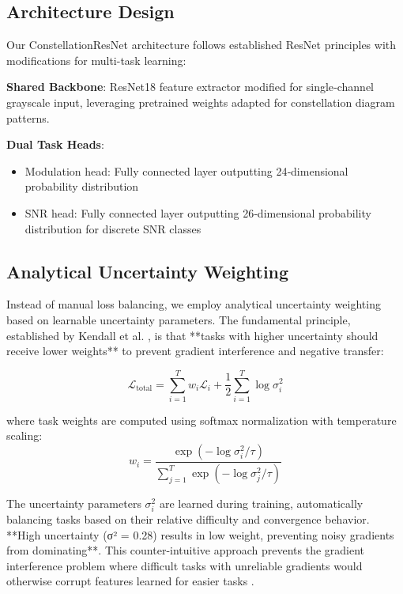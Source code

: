 \documentclass{ELSP}
\begin{document}
\subsection{Architecture Design}

Our ConstellationResNet architecture follows established ResNet principles \cite{kumar2023automatic} with modifications for multi-task learning:

\textbf{Shared Backbone}: ResNet18 feature extractor modified for single‑channel grayscale input, leveraging pretrained weights adapted for constellation diagram patterns.

\textbf{Dual Task Heads}: 
\begin{itemize}
\item Modulation head: Fully connected layer outputting 24‑dimensional probability distribution
\item SNR head: Fully connected layer outputting 26‑dimensional probability distribution for discrete SNR classes
\end{itemize}

\subsection{Analytical Uncertainty Weighting}

Instead of manual loss balancing, we employ analytical uncertainty weighting \cite{liu2024analytical} based on learnable uncertainty parameters. The fundamental principle, established by Kendall et al. \cite{kendall2018multi}, is that **tasks with higher uncertainty should receive lower weights** to prevent gradient interference and negative transfer:

\begin{equation}
\mathcal{L}_{\text{total}} = \sum_{i=1}^{T} w_i \mathcal{L}_i + \frac{1}{2}\sum_{i=1}^{T} \log \sigma_i^2
\end{equation}

where task weights are computed using softmax normalization with temperature scaling:
\begin{equation}
w_i = \frac{\exp(-\log \sigma_i^2 / \tau)}{\sum_{j=1}^{T} \exp(-\log \sigma_j^2 / \tau)}
\end{equation}

The uncertainty parameters $\sigma_i^2$ are learned during training, automatically balancing tasks based on their relative difficulty and convergence behavior. **High uncertainty (σ² = 0.28) results in low weight, preventing noisy gradients from dominating**. This counter-intuitive approach prevents the gradient interference problem where difficult tasks with unreliable gradients would otherwise corrupt features learned for easier tasks \cite{kendall2018multi,liu2024analytical}.
\end{document}
